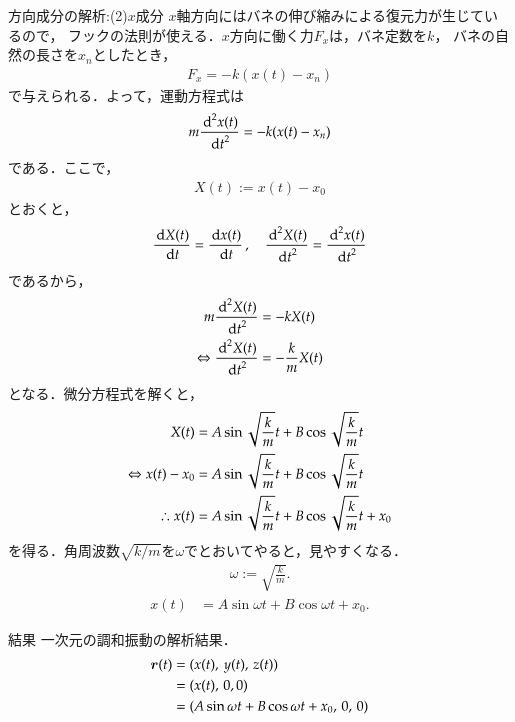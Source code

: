     \begin{mysmallsec}{方向成分の解析:(2)$x$成分}
        $x$軸方向にはバネの伸び縮みによる復元力が生じているので，
        フックの法則が使える．$x$方向に働く力${F}_{x}$は，バネ定数を$k$，
        バネの自然の長さを${x}_{n}$としたとき，
        \begin{align}
            {F}_{x} = -k(x(t)-{x}_{n})
        \end{align}
        で与えられる．よって，運動方程式は
        \begin{align}
            m\frac{{\,\mathrm{d}}^{2} x(t)}{{\,\mathrm{d} t}^{2}} = -k(x(t)-{x}_{n})
        \end{align}
        である．ここで，
        \begin{align}
            X(t) :=  x(t) - {x}_{0}
        \end{align}
        とおくと，
        \[
            \frac{\,\mathrm{d} X(t)}{\,\mathrm{d} t} = \frac{\,\mathrm{d} x(t)}{\,\mathrm{d} t} \, , \quad \frac{{\,\mathrm{d}}^{2} X(t)}{{\,\mathrm{d} t}^{2}} = \frac{{\,\mathrm{d}}^{2} x(t)}{{\,\mathrm{d} t}^{2}}
        \]
        であるから，
        \begin{align}
                            m\frac{{\,\mathrm{d}}^{2} X(t)}{{\,\mathrm{d} t}^{2}} &= -kX(t) \notag \\
            \Leftrightarrow \frac{{\,\mathrm{d}}^{2} X(t)}{{\,\mathrm{d} t}^{2}}  &= -\frac{k}{m}X(t)
        \end{align}
        となる．微分方程式を解くと，
        \begin{align}
                             X(t)            &= A \sin \sqrt{\frac{k}{m}} t + B \cos \sqrt{\frac{k}{m}} t \notag \\
            \Leftrightarrow  x(t) - {x}_{0}  &= A \sin \sqrt{\frac{k}{m}} t + B \cos \sqrt{\frac{k}{m}} t \notag \\
            \therefore       x(t)            &= A \sin \sqrt{\frac{k}{m}} t + B \cos \sqrt{\frac{k}{m}} t + {x}_{0}
        \end{align}
        を得る．角周波数$\sqrt{k/m}$を$\omega$でとおいてやると，見やすくなる．
        \begin{align}
            \omega := \sqrt{\frac{k}{m}}.
        \end{align}
        \begin{align}
            x(t) &= A \sin \omega t + B \cos \omega t + {x}_{0}.
        \end{align}

    \end{mysmallsec}

    \begin{mysmallsec}{結果}
        一次元の調和振動の解析結果．
        \begin{align}
            \boldsymbol{r}(t) &= (x(t),\,y(t),\,z(t)) \notag \\
                   &= (x(t),\,0,0)  \notag \\
                   &= (A \sin \omega t + B \cos \omega t + {x}_{0},\,0,\,0)
        \end{align}
    \end{mysmallsec}

